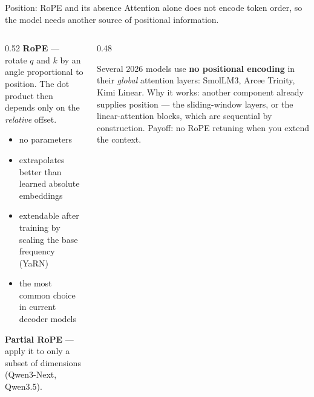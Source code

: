 \documentclass[aspectratio=169,10pt]{beamer}
\begin{document}
\begin{frame}[shrink=3]{Position: RoPE and its absence}
  Attention alone does not encode token order, so the model needs another
  source of positional information.
  \vspace{0.5em}
  \begin{columns}[T]
    \begin{column}{0.52\textwidth}
      \textbf{RoPE} --- rotate $q$ and $k$ by an angle proportional to position.
      The dot product then depends only on the \emph{relative} offset.
      \begin{itemize}
        \item no parameters
        \item extrapolates better than learned absolute embeddings
        \item extendable after training by scaling the base frequency (YaRN)
        \item the most common choice in current decoder models
      \end{itemize}
      \vspace{0.4em}
      \textbf{Partial RoPE} --- apply it to only a subset of dimensions
      (Qwen3-Next, Qwen3.5).
    \end{column}
    \begin{column}{0.48\textwidth}
      \begin{gotcha}
        Several 2026 models use \textbf{no positional encoding} in their
        \emph{global} attention layers: SmolLM3, Arcee Trinity, Kimi Linear.
        \vspace{0.4em}
        Why it works: another component already supplies position --- the
        sliding-window layers, or the linear-attention blocks, which are
        sequential by construction.
        \vspace{0.4em}
        Payoff: no RoPE retuning when you extend the context.
      \end{gotcha}
    \end{column}
  \end{columns}
\end{frame}
\end{document}
